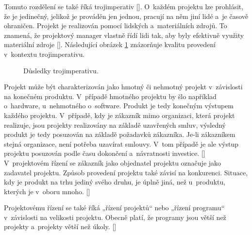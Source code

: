 \documentclass[
	11pt, oneside, printed, final, palatino, monochrome
	microtype,
	table,   %
	lof,     %
	lot     %
]{fithesis3}
\newcommand{\citepages}[2]{[\cite[#1]{#2}]}
\begin{document}
{Tomuto rozdělení se také říká trojimperativ \citepages{5}{rosenau_2000}. O~každém projektu lze prohlásit, že je jedinečný, jelikož je prováděn jen jednou, pracují na něm jiní lidé a~je časově ohraničen. Projekt je realizován pomocí lidských a~materiálních zdrojů. To znamená, že projektový manager vlastně řídí lidi tak, aby byly efektivně využity materiální zdroje \citepages{28}{rehacek_2013}. Následující obrázek \ref{fig:trojimperativ} znázorňuje kvalitu provedení v~kontextu trojimperativu.

\begin{figure}
    \centering
	\def\svgwidth{1.0\textwidth}
    
	\caption{Důsledky trojimperativu.}
	\label{fig:trojimperativ}
\end{figure}

Projekt může být charakterizován jako hmotný či nehmotný projekt v~závislosti na konečném produktu. V~případě hmotného projektu by šlo například o~hardware, u~nehmotného o~software. Produkt je tedy konečným výstupem každého projektu.
V~případě, kdy je zákazník mimo organizaci, která projekt realizuje, jsou projekty realizovány na základě uzavřených smluv, výsledný produkt je tedy posuzován na základě požadavků zákazníka. Je-li zákazníkem stejná organizace, není potřeba uzavírat smlouvy. V~tom případě je ale výstup projektu posuzován podle času dokončení a~návratnosti investice. \citepages{10-12}{rosenau_2000}  V~projektovém řízení se zákazník jako objednatel projektu označuje jako zadavatel projektu. Způsob provedení projektu také závisí na konkurenci. Situace, kdy je produkt na trhu jediný svého druhu, je úplně jiná, než u~produktu, kterých je v~oboru mnoho. \citepages{12}{rosenau_2000}

Projektovému řízení se také říká „řízení projektů“ nebo „řízení programu“ v~závislosti na velikosti projektu. Obecně platí, že programy jsou větší než projekty a~projekty větší než úkoly. \citepages{12}{rosenau_2000}

}
\end{document}
